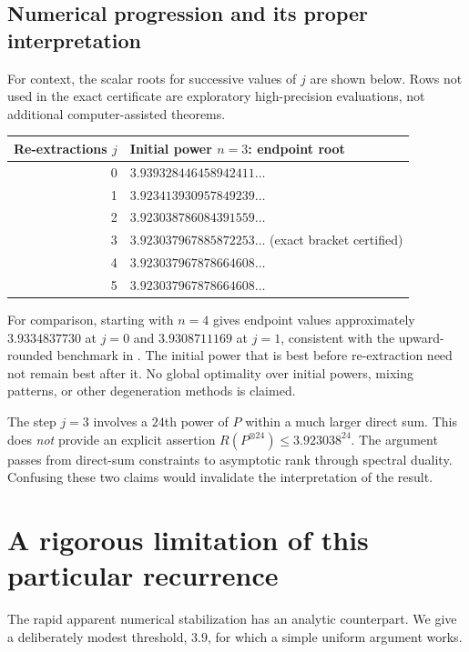\documentclass[11pt]{article}
\theoremstyle{definition}\newtheorem{definition}[theorem]{Definition}
\theoremstyle{remark}\newtheorem{remark}[theorem]{Remark}
\begin{document}
\subsection{Numerical progression and its proper interpretation}
For context, the scalar roots for successive values of $j$ are shown below.
Rows not used in the exact certificate are exploratory high-precision
evaluations, not additional computer-assisted theorems.
\begin{center}
\begin{tabular}{rl}
\toprule
Re-extractions $j$ & Initial power $n=3$: endpoint root\\\midrule
0 & $3.939328446458942411\ldots$\\
1 & $3.923413930957849239\ldots$\\
2 & $3.923038786084391559\ldots$\\
3 & $3.923037967885872253\ldots$ \quad(exact bracket certified)\\
4 & $3.923037967878664608\ldots$\\
5 & $3.923037967878664608\ldots$\\\bottomrule
\end{tabular}
\end{center}
For comparison, starting with $n=4$ gives endpoint values approximately
$3.9334837730$ at $j=0$ and $3.9308711169$ at $j=1$, consistent with the
upward-rounded benchmark in \cite[Table 1]{alman}. The initial power that is
best before re-extraction need not remain best after it. No global optimality
over initial powers, mixing patterns, or other degeneration methods is claimed.

The step $j=3$ involves a $24$th power of $P$ within a much larger direct sum.
This does \emph{not} provide an explicit assertion
$R(P^{\otimes24})\leq3.923038^{24}$. The argument passes from direct-sum
constraints to asymptotic rank through spectral duality. Confusing these two
claims would invalidate the interpretation of the result.

\section{A rigorous limitation of this particular recurrence}\label{sec:barrier}
The rapid apparent numerical stabilization has an analytic counterpart.
We give a deliberately modest threshold, $3.9$, for which a simple uniform
argument works.
\end{document}
